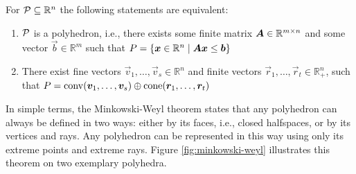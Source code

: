 \begin{theorem}\label{th:minkowski-weyl}
For $\mathcal{P} \subseteq \mathbb{R}^n$ the following statements are equivalent:

\begin{enumerate}
\item $\mathcal{P}$ is a polyhedron, i.e., there exists some finite matrix ${\bm{A}} \in \mathbb{R}^{m \times n}$ and some vector $\vec{b} \in \mathbb{R}^m$ such that $P = \{{\bm{x}} \in \mathbb{R}^n \mid {\bm{A}} {\bm{x}} \leq {\bm{b}}\}$
\item There exist fine vectors $\vec{v}_1, \dots, \vec{v}_s \in \mathbb{R}^n$ and finite vectors $\vec{r}_1, \dots, \vec{r}_t \in \mathbb{R}_+^n$, such that $P = \operatorname{conv}({\bm{v}}_1, \dots, {\bm{v}}_s) \oplus \operatorname{cone}({\bm{r}}_1, \dots, {\bm{r}}_t)$
\end{enumerate}
\end{theorem}

In simple terms, the Minkowski-Weyl theorem states that any polyhedron can always be defined in two ways: either by its faces, i.e., closed halfspaces, or by its vertices and rays. Any polyhedron can be represented in this way using only its extreme points and extreme rays. Figure \ref{fig:minkowski-weyl} illustrates this theorem on two exemplary polyhedra.

